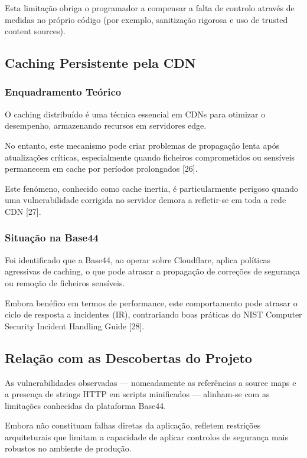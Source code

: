 Esta limitação obriga o programador a compensar a falta de controlo através de medidas no próprio código (por exemplo, sanitização rigorosa e uso de trusted content sources).

\subsection{Caching Persistente pela CDN}

\subsubsection{Enquadramento Teórico}

O caching distribuído é uma técnica essencial em CDNs para otimizar o desempenho, armazenando recursos em servidores edge.

No entanto, este mecanismo pode criar problemas de propagação lenta após atualizações críticas, especialmente quando ficheiros comprometidos ou sensíveis permanecem em cache por períodos prolongados [26].

Este fenómeno, conhecido como cache inertia, é particularmente perigoso quando uma vulnerabilidade corrigida no servidor demora a refletir-se em toda a rede CDN [27].

\subsubsection{Situação na Base44}

Foi identificado que a Base44, ao operar sobre Cloudflare, aplica políticas agressivas de caching, o que pode atrasar a propagação de correções de segurança ou remoção de ficheiros sensíveis.

Embora benéfico em termos de performance, este comportamento pode atrasar o ciclo de resposta a incidentes (IR), contrariando boas práticas do NIST Computer Security Incident Handling Guide [28].

\subsection{Relação com as Descobertas do Projeto}

As vulnerabilidades observadas — nomeadamente as referências a source maps e a presença de strings HTTP em scripts minificados — alinham-se com as limitações conhecidas da plataforma Base44.

Embora não constituam falhas diretas da aplicação, refletem restrições arquiteturais que limitam a capacidade de aplicar controlos de segurança mais robustos no ambiente de produção.

